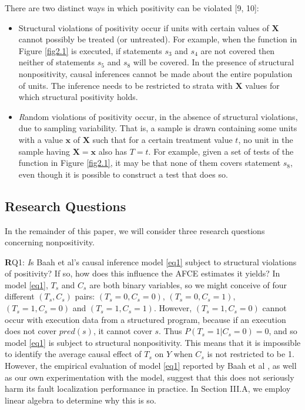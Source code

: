 There are two distinct ways in which positivity can be violated [9, 10]:
\begin{itemize}
\item Structural violations of positivity occur if units with certain values of $\mathbf{X}$ cannot possibly be treated (or untreated).   For example, when the function in Figure \ref{fig2.1} is executed, if statements $s_3$ and $s_4$ are not covered then neither of statements $s_5$ and $s_8$ will be covered.  In the presence of structural nonpositivity, causal inferences cannot be made about the entire population of units.  The inference needs to be restricted to strata with $\mathbf{X}$ values for which structural positivity holds.

\item {\textit Random violations} of positivity occur, in the absence of structural violations, due to sampling variability. That is, a sample is drawn containing some units with a value $\mathbf{x}$ of $\mathbf{X}$ such that for a certain treatment value $t$, no unit in the sample having $\mathbf{X=x}$ also has $T=t$.   For example, given a set of tests of the function in Figure \ref{fig2.1}, it may be that none of them covers statement $s_8$, even though it is possible to construct a test that does so.
\end{itemize}

\subsection{Research Questions}\label{question}
In the remainder of this paper, we will consider three research questions concerning nonpositivity.

{\textbf RQ1}: {\textit Is Baah et al’s causal inference model \eqref{eq1} subject to structural violations of positivity?  If so, how does this influence the AFCE estimates it yields?} In model \eqref{eq1}, $T_s$ and $C_s$ are both binary variables, so we might conceive of four different $(T_s,C_s)$ pairs: $(T_s=0,C_s=0)$, $(T_s=0,C_s=1)$,  $(T_s=1,C_s=0)$ and $(T_s=1,C_s=1)$.  However, $(T_s=1,C_s=0)$ cannot occur with execution data from a structured program, because if an execution does not cover $pred(s)$, it cannot cover $s$.  Thus $P(T_s=1|C_s=0)=0$, and so model \eqref{eq1} is subject to structural nonpositivity.  This means that it is impossible to identify the average causal effect of $T_s$ on $Y$ when $C_s$ is not restricted to be 1.  However, the empirical evaluation of model \eqref{eq1} reported by Baah et al \cite{baah2010causal}, as well as our own experimentation with the model, suggest that this does not seriously harm its fault localization performance in practice.  In Section III.A, we employ linear algebra to determine why this is so.

